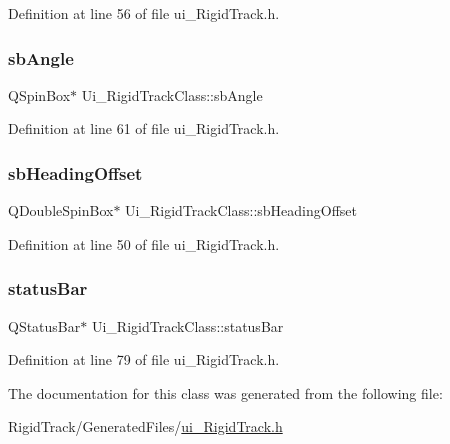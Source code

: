 Definition at line 56 of file ui\+\_\+\+Rigid\+Track.\+h.

\mbox{\label{class_ui___rigid_track_class_ac232f3d19d53b00aa61431725cbf71c4}} 
\subsubsection{\texorpdfstring{sb\+Angle}{sbAngle}}
{\footnotesize\ttfamily Q\+Spin\+Box$\ast$ Ui\+\_\+\+Rigid\+Track\+Class\+::sb\+Angle}



Definition at line 61 of file ui\+\_\+\+Rigid\+Track.\+h.

\mbox{\label{class_ui___rigid_track_class_a7a9db994f872078ce46a81b435f70cf9}} 
\subsubsection{\texorpdfstring{sb\+Heading\+Offset}{sbHeadingOffset}}
{\footnotesize\ttfamily Q\+Double\+Spin\+Box$\ast$ Ui\+\_\+\+Rigid\+Track\+Class\+::sb\+Heading\+Offset}



Definition at line 50 of file ui\+\_\+\+Rigid\+Track.\+h.

\mbox{\label{class_ui___rigid_track_class_ac1ced4ae725bc0095307704d5d4fc4f2}} 
\subsubsection{\texorpdfstring{status\+Bar}{statusBar}}
{\footnotesize\ttfamily Q\+Status\+Bar$\ast$ Ui\+\_\+\+Rigid\+Track\+Class\+::status\+Bar}



Definition at line 79 of file ui\+\_\+\+Rigid\+Track.\+h.



The documentation for this class was generated from the following file\+:\begin{DoxyCompactItemize}
\item 
Rigid\+Track/\+Generated\+Files/\hyperlink{ui___rigid_track_8h}{ui\+\_\+\+Rigid\+Track.\+h}\end{DoxyCompactItemize}
